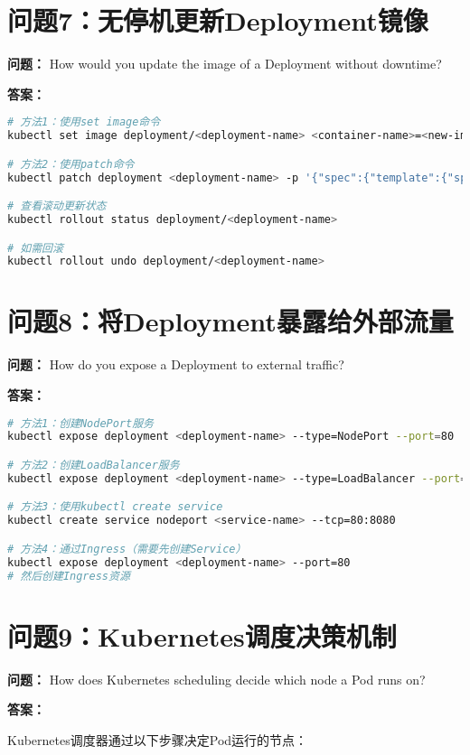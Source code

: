 \documentclass[12pt,a4paper]{article}
\begin{document}
\section{问题7：无停机更新Deployment镜像}

\textbf{问题：} How would you update the image of a Deployment without downtime?

\textbf{答案：}
\begin{lstlisting}[language=bash]
# 方法1：使用set image命令
kubectl set image deployment/<deployment-name> <container-name>=<new-image>

# 方法2：使用patch命令
kubectl patch deployment <deployment-name> -p '{"spec":{"template":{"spec":{"containers":[{"name":"<container-name>","image":"<new-image>"}]}}}}'

# 查看滚动更新状态
kubectl rollout status deployment/<deployment-name>

# 如需回滚
kubectl rollout undo deployment/<deployment-name>
\end{lstlisting}

\section{问题8：将Deployment暴露给外部流量}

\textbf{问题：} How do you expose a Deployment to external traffic?

\textbf{答案：}
\begin{lstlisting}[language=bash]
# 方法1：创建NodePort服务
kubectl expose deployment <deployment-name> --type=NodePort --port=80

# 方法2：创建LoadBalancer服务
kubectl expose deployment <deployment-name> --type=LoadBalancer --port=80

# 方法3：使用kubectl create service
kubectl create service nodeport <service-name> --tcp=80:8080

# 方法4：通过Ingress（需要先创建Service）
kubectl expose deployment <deployment-name> --port=80
# 然后创建Ingress资源
\end{lstlisting}

\section{问题9：Kubernetes调度决策机制}

\textbf{问题：} How does Kubernetes scheduling decide which node a Pod runs on?

\textbf{答案：}

Kubernetes调度器通过以下步骤决定Pod运行的节点：
\end{document}
